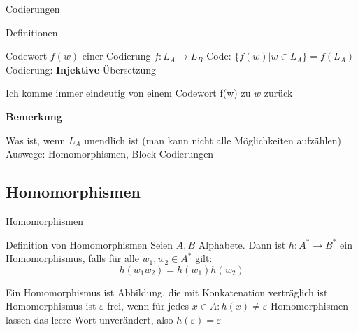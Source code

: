 \documentclass{beamer}
\begin{document}
\begin{frame}{Codierungen}	
	\begin{block}{Definitionen}
		\begin{itemize}
			\pitem Codewort $f(w)$ \p einer Codierung $f: L_A \rightarrow L_B$
			\pitem Code: $\{f(w)|w \in L_A\} = f(L_A)$
			\pitem Codierung: \textbf{Injektive} Übersetzung
			\begin{itemize}
				\pitem Ich komme immer eindeutig von einem Codewort f(w) zu $w$ zurück
			\end{itemize}
		\end{itemize}
	\end{block}\p
	\textbf{Bemerkung}\\
	\begin{itemize}
		\pitem Was ist, wenn $L_A$ unendlich ist (man kann nicht alle Möglichkeiten aufzählen)
		\pitem Auswege: Homomorphismen, Block-Codierungen
	\end{itemize}
\end{frame}


\subsection{Homomorphismen}

\begin{frame}{Homomorphismen}
	\begin{block} {Definition von Homomorphismen}\p
		Seien $A, B$ Alphabete. \p Dann ist $h: A^* \rightarrow B^*$ \p ein Homomorphismus\p , falls für alle $w_1, w_2 \in A^*$ gilt:\\ \p
		\begin{equation*}
		h(w_1w_2) = h(w_1)h(w_2)
		\end{equation*}
	\end{block}

	\begin{itemize}
		\pitem Ein Homomorphismus ist Abbildung, die mit Konkatenation verträglich ist
		\pitem Homomorphismus ist $\varepsilon$-frei, wenn für jedes $x \in A: h(x) \neq \varepsilon$
		\pitem Homomorphismen lassen das leere Wort unverändert, also $h(\varepsilon) = \varepsilon$
	\end{itemize}
\end{frame}
\end{document}
